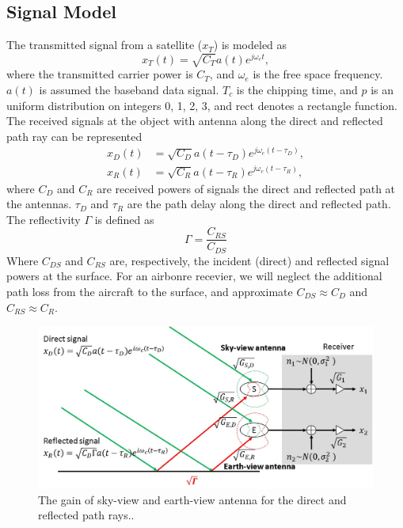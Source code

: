 \documentclass[draftcls,onecolumn]{IEEEtran}  %
\begin{document}
\subsection{Signal Model}
The transmitted signal from a satellite ($x_{T}$) is modeled as
\begin{equation}
	x_T(t)=\sqrt{C_T}a(t)e^{j\omega_et},
    \label{Eq:xT}
\end{equation}
where the transmitted carrier power is $C_{T}$,  and $\omega_{e}$ is the free space frequency. $a(t)$ is assumed the baseband data signal. $T_c$  is the chipping time, and $p$ is an uniform distribution  on integers 0, 1, 2, 3, and rect denotes a rectangle function. The received signals at the object with antenna along the direct and reflected path ray can be represented 
\begin{eqnarray}
  	x_D(t)&=\sqrt{C_D}a(t-\tau_D)e^{j\omega_e(t-\tau_D)}, \\
    x_R(t)&=\sqrt{C_R}a(t-\tau_R)e^{j\omega_e(t-\tau_R)}, 
    \label{Eq:xD_xR}
\end{eqnarray}
where $C_D$ and $C_R$ are received powers of signals the direct and reflected path at the antennas.  
$\tau_D$ and $\tau_R$ are the path delay along the direct and reflected path. The reflectivity $\Gamma$ is defined as
\begin{equation}
	\Gamma=\frac{C_{RS}}{C_{DS}}
    \label{Eq:reflect}
\end{equation}
Where $C_{DS}$ and $C_{RS}$ are, respectively, the incident (direct) and reflected signal powers at the surface. 
For an airbonre recevier, we will neglect the additional path loss from the aircraft to the surface, and approximate $C_{DS}\approx C_D$ and $C_{RS}\approx C_R$. 
\begin{figure}[t!]
	\centering
    \centering
	\includegraphics[width=5 in]{pdf/Picture1.jpg}
	\caption{The gain of sky-view and earth-view antenna for the direct and reflected path rays..}
	\label{fig:Hardware}
\end{figure}
\end{document}
